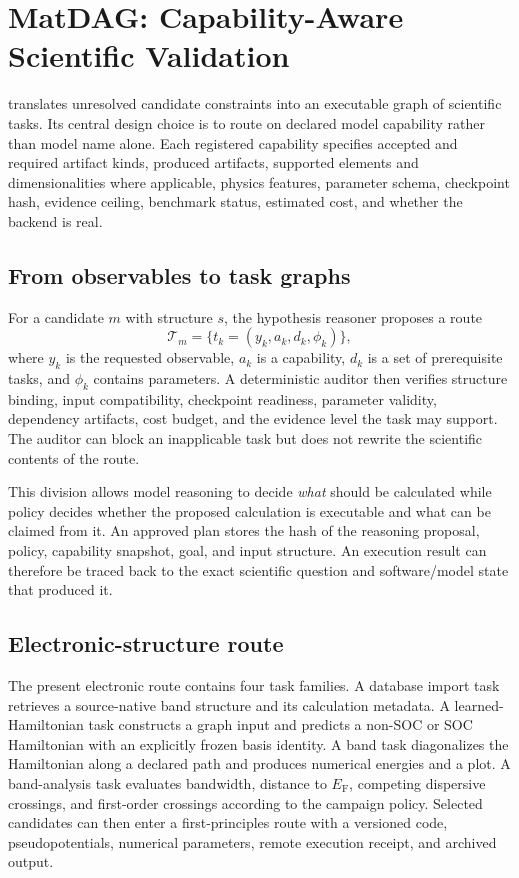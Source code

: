 \section{MatDAG: Capability-Aware Scientific Validation}
\label{sec:matdag}

\matdag translates unresolved candidate constraints into an executable graph of scientific tasks.  Its central design choice is to route on declared model capability rather than model name alone.  Each registered capability specifies accepted and required artifact kinds, produced artifacts, supported elements and dimensionalities where applicable, physics features, parameter schema, checkpoint hash, evidence ceiling, benchmark status, estimated cost, and whether the backend is real.

\subsection{From observables to task graphs}

For a candidate $m$ with structure $s$, the hypothesis reasoner proposes a route
\begin{equation}
    \mathcal{T}_m=\{t_k=(y_k,a_k,d_k,\phi_k)\},
\end{equation}
where $y_k$ is the requested observable, $a_k$ is a capability, $d_k$ is a set of prerequisite tasks, and $\phi_k$ contains parameters.  A deterministic auditor then verifies structure binding, input compatibility, checkpoint readiness, parameter validity, dependency artifacts, cost budget, and the evidence level the task may support.  The auditor can block an inapplicable task but does not rewrite the scientific contents of the route.

This division allows model reasoning to decide \emph{what} should be calculated while policy decides whether the proposed calculation is executable and what can be claimed from it.  An approved plan stores the hash of the reasoning proposal, policy, capability snapshot, goal, and input structure.  An execution result can therefore be traced back to the exact scientific question and software/model state that produced it.

\subsection{Electronic-structure route}

The present electronic route contains four task families.  A database import task retrieves a source-native band structure and its calculation metadata.  A learned-Hamiltonian task constructs a graph input and predicts a non-SOC or SOC Hamiltonian with an explicitly frozen basis identity.  A band task diagonalizes the Hamiltonian along a declared path and produces numerical energies and a plot.  A band-analysis task evaluates bandwidth, distance to $E_\mathrm{F}$, competing dispersive crossings, and first-order crossings according to the campaign policy.  Selected candidates can then enter a first-principles route with a versioned code, pseudopotentials, numerical parameters, remote execution receipt, and archived output.

